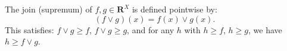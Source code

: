 The join (supremum) of $f, g \in \mathbf{R}^X$ is defined pointwise by:
$$(f \vee g)(x) = f(x) \vee g(x).$$
This satisfies: $f \vee g \geq f$, $f \vee g \geq g$, and for any $h$ with $h \geq f$, $h \geq g$, we have $h \geq f \vee g$.
